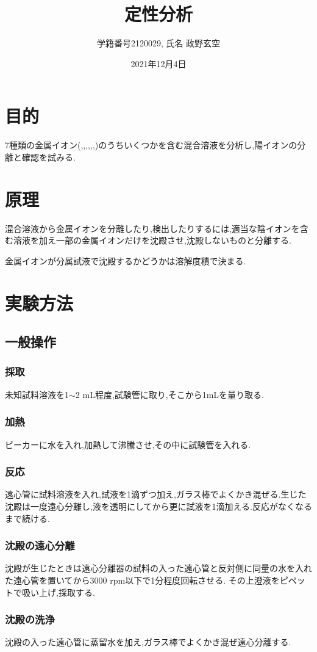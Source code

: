 \documentclass[a4j,10pt]{jarticle}
\title{定性分析}
\author{学籍番号2120029, 氏名 政野玄空}
\date{2021年12月4日}
\begin{document}
\maketitle
  \section{目的}
  7種類の金属イオン(,,,,,,)のうちいくつかを含む混合溶液を分析し,陽イオンの分離と確認を試みる.

  \section{原理}
  混合溶液から金属イオンを分離したり,検出したりするには,適当な陰イオンを含む溶液を加え一部の金属イオンだけを沈殿させ,沈殿しないものと分離する.

  金属イオンが分属試液で沈殿するかどうかは溶解度積で決まる.
  \section{実験方法}
  \subsection{一般操作}
  \subsubsection{採取}
  未知試料溶液を1$\sim$2 mL程度,試験管に取り,そこから1mLを量り取る.
  \subsubsection{加熱}
  ビーカーに水を入れ,加熱して沸騰させ,その中に試験管を入れる.
  \subsubsection{反応}
  遠心管に試料溶液を入れ,試液を1滴ずつ加え,ガラス棒でよくかき混ぜる.生じた沈殿は一度遠心分離し,液を透明にしてから更に試液を1滴加える.反応がなくなるまで続ける.
  \subsubsection{沈殿の遠心分離}
  沈殿が生じたときは遠心分離器の試料の入った遠心管と反対側に同量の水を入れた遠心管を置いてから3000 rpm以下で1分程度回転させる.
  その上澄液をピペットで吸い上げ,採取する.
  \subsubsection{沈殿の洗浄}
  沈殿の入った遠心管に蒸留水を加え,ガラス棒でよくかき混ぜ遠心分離する.
\end{document}
